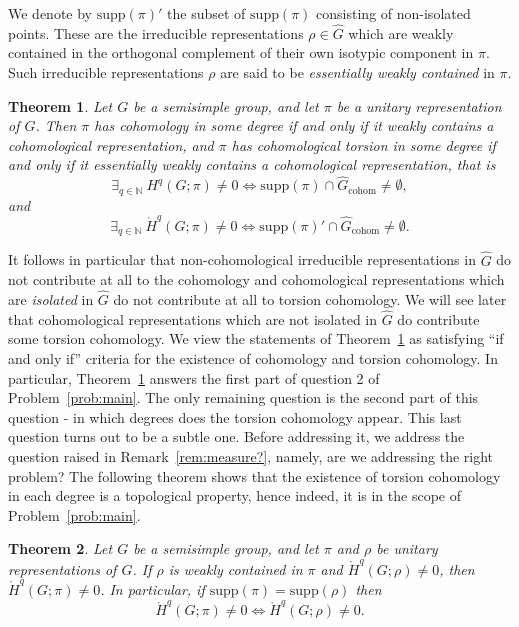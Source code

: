 \documentclass[12pt,reqno]{amsart}
\newcommand{\N}{\mathbb{N}}
\newtheorem{mainthm}{Theorem}
\theoremstyle{definition}
\newcommand{\torH}{\mathring{H}}
\begin{document}
We denote by $\mathrm{supp}(\pi)'$ the subset of $\mathrm{supp}(\pi)$ consisting of non-isolated points.
These are the irreducible representations $\rho\in \widehat{G}$ which are weakly contained in the orthogonal complement of their own isotypic component in $\pi$. 
Such irreducible representations $\rho$ are said to be \emph{essentially weakly contained} in $\pi$.

\begin{mainthm}\label{intro:topological propery1}
Let $G$ be a semisimple group, and let $\pi$ be a unitary representation of $G$.
Then $\pi$ has cohomology in some degree if and only if it weakly contains a cohomological representation, and $\pi$ has cohomological torsion in some degree if and only if it essentially weakly contains a cohomological representation, that is 
\[ \exists_{q\in\N}~H^q(G;\pi)\neq 0 \iff \mathrm{supp}(\pi) \cap \widehat{G}_{\mathrm{cohom}} \neq \emptyset,  \]
and 
\[ \exists_{q\in\N}~\torH^q(G;\pi)\neq 0 \iff \mathrm{supp}(\pi)' \cap \widehat{G}_{\mathrm{cohom}} \neq \emptyset.  \]
\end{mainthm}

It follows in particular that non-cohomological irreducible representations in $\widehat{G}$ do not contribute at all to the cohomology and 
cohomological representations which are \emph{isolated} in $\widehat{G}$ do not contribute at all to torsion cohomology. 
We will see later that cohomological representations which are not isolated in $\widehat{G}$ do contribute some torsion cohomology.
We view the statements of Theorem~\ref{intro:topological propery1} as satisfying ``if and only if'' criteria for the existence of cohomology and torsion cohomology.
In particular, Theorem~\ref{intro:topological propery1} answers the first part of question 2 of Problem~\ref{prob:main}.
The only remaining question is the second part of this question -  in which degrees does the torsion cohomology appear.
This last question turns out to be a subtle one.
Before addressing it, we address the question raised in Remark~\ref{rem:measure?}, namely, are we addressing the right problem?
The following theorem shows that the existence of torsion cohomology in each degree is a topological property, hence indeed, it is in the scope of Problem~\ref{prob:main}.

\begin{mainthm}\label{intro:topological propery}
    Let $G$ be a semisimple group, and let $\pi$ and $\rho$ be unitary representations of $G$.
    If $\rho$ is weakly contained in $\pi$ and $\torH^q(G;\rho) \ne 0$, then $\torH^q(G;\pi) \ne 0$. In particular, if $\mathrm{supp}(\pi)=\mathrm{supp}(\rho)$ then 
    \[ \torH^q(G;\pi)\neq 0 \iff \torH^q(G;\rho) \neq 0. \]
\end{mainthm}
\end{document}
